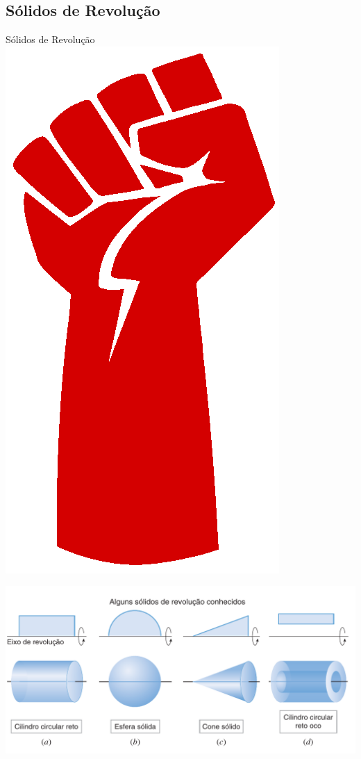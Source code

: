 \subsection*{Sólidos de Revolução}
\begin{frame}{Sólidos de Revolução \includegraphics[scale=0.015]{figuras/fist.png}}\label{current}
\begin{center}
\includegraphics[scale=.4]{figuras/solidos-revolucao.png}
\end{center}
\end{frame}



